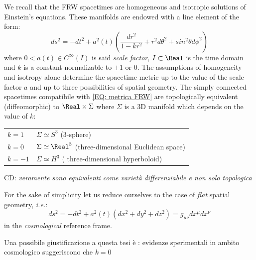 \documentclass[Main]{subfiles}
\begin{document}
	We recall that the FRW spacetimes are homogeneous and isotropic solutions of Einstein's equations.
	These manifolds are endowed with a line element of the form:
	\begin{equation}\label{EQ: metrica FRW}
		ds^2 = -dt^2 + a^2(t) \left( \frac{dr^2}{1-k r^2} + r^2 d\theta^2 + sin^2\theta d\phi^2\right)
	\end{equation}
		where $0 < a(t) \in C^\infty	(I)$ is said \emph{scale factor}, $I \subset \Real$ is the time domain and $k$ is a constant normalizable to $\pm 1$ or $0$.
		The assumptions of homogeneity and isotropy alone determine the spacetime metric up to the value of the scale factor $a$ and up to three possibilities of spatial geometry.
		The simply connected spacetimes compatibile with \ref{EQ: metrica FRW} are topologically equivalent (diffeomorphic) 		
		to $\Real \times \Sigma$ where $\Sigma$ is a 3D manifold which depends on the value of $k$:
		\begin{center}\begin{tabular}{l l}
			$k = 1$ & $\Sigma \simeq S^3$ (3-sphere)\\
			$k = 0$ & $\Sigma \simeq \Real^3$ (three-dimensional Euclidean space)\\
			$k = -1$ & $\Sigma \simeq H^3$ ( three-dimensional hyperboloid)\\		
		\end{tabular}\end{center}
		\vspace{2mm}
\ifToninus
		\begin{Warning}
		CD:
		\emph{veramente sono equivalenti come varietà differenziabile e non solo topologica}
		\end{Warning}
\fi

		For the sake of simplicity let us reduce ourselves to the case of \emph{flat} spatial geometry, \textit{i.e.}:
		\begin{displaymath}
			ds^2 = -dt^2 + a^2(t) \left( dx^2 + dy^2 + dz^2\right) = g_{\mu \nu} dx^\mu dx^\nu
		\end{displaymath}
		in the \emph{cosmological} reference frame.
\ifToninus
	\begin{Warning}
		Una possibile giustificazione a questa tesi è : evidenze sperimentali in ambito cosmologico suggeriscono che $k=0$
	\end{Warning}
\fi
\end{document}
